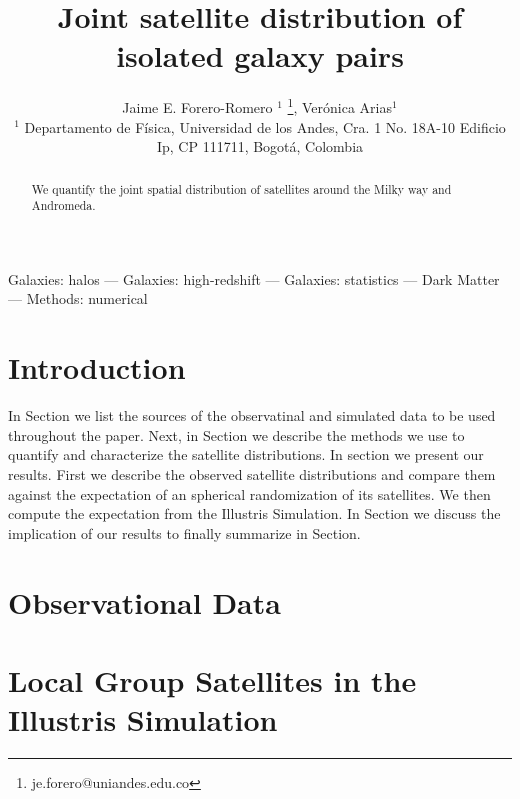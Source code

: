 \documentclass[a4paper,fleqn,usenatbib]{mnras}
\begin{document}
\title[Satellites in the MW and M31]{Joint 
  satellite distribution of isolated galaxy pairs}  
\author[J.E. Forero-Romero \& V. Arias]
{Jaime E. Forero-Romero $^{1}$ \thanks{je.forero@uniandes.edu.co},
Ver\'onica Arias$^1$\\
$^1$ Departamento de F\'isica, Universidad de los Andes, Cra. 1
  No. 18A-10 Edificio Ip, CP 111711, Bogot\'a, Colombia \\
}

\maketitle

\begin{abstract}
We quantify the joint spatial distribution of satellites around the Milky way and Andromeda.
\end{abstract}

\begin{keywords}Galaxies: halos --- Galaxies: high-redshift --- Galaxies: statistics
--- Dark Matter --- Methods: numerical 
\end{keywords}

\section{Introduction}


In Section we list the sources of the observatinal and
simulated data to be used throughout the paper.
Next, in Section we describe the methods we use to quantify and
characterize the satellite distributions.
In section we present our results. 
First we describe the observed satellite distributions and compare
them against the expectation of an spherical randomization of its
satellites. We then compute the expectation from the Illustris Simulation. 
In Section we discuss the implication of our results to finally
summarize in Section.

\section{Observational Data}
\label{sec:obs}


\section{Local Group Satellites in the Illustris Simulation}
\label{sec:NumericalSetup}
\end{document}
